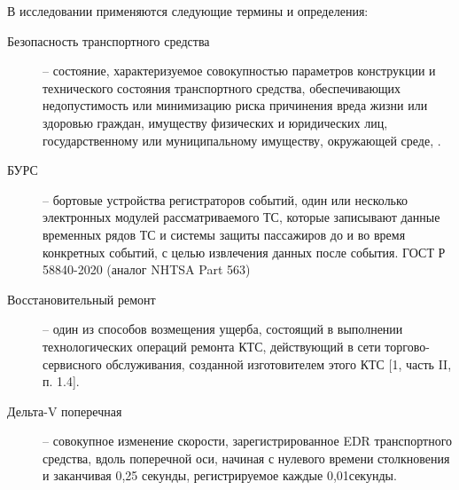 В исследовании применяются следующие термины и определения:
\begin{description}
\item[Безопасность транспортного средства] -- состояние, характеризуемое совокупностью параметров конструкции и технического состояния транспортного средства, обеспечивающих недопустимость или минимизацию риска причинения вреда жизни или здоровью граждан, имуществу физических и юридических лиц, государственному или муниципальному имуществу, окружающей среде, \cite[п. 6]{0182011:tr}.	%
\item[БУРС]-- бортовые устройства регистраторов событий, один или несколько электронных модулей рассматриваемого ТС, которые записывают данные временных рядов ТС и системы защиты пассажиров до и во время конкретных событий, с целью извлечения
данных после события. ГОСТ Р 58840-2020 (аналог NHTSA Part 563) \cite{58840:gost}
\item[Восстановительный ремонт]-- один из способов возмещения ущерба, состоящий в выполнении технологических операций ремонта КТС, действующий в сети торгово-сервисного обслуживания, созданной изготовителем этого КТС [1, часть II, п. 1.4].
	\item[Дельта-V поперечная] -- совокупное изменение скорости, зарегистрированное EDR транспортного средства, вдоль поперечной оси, начиная с нулевого времени столкновения и заканчивая 0,25 секунды, регистрируемое каждые 0,01секунды.

\end{description}
